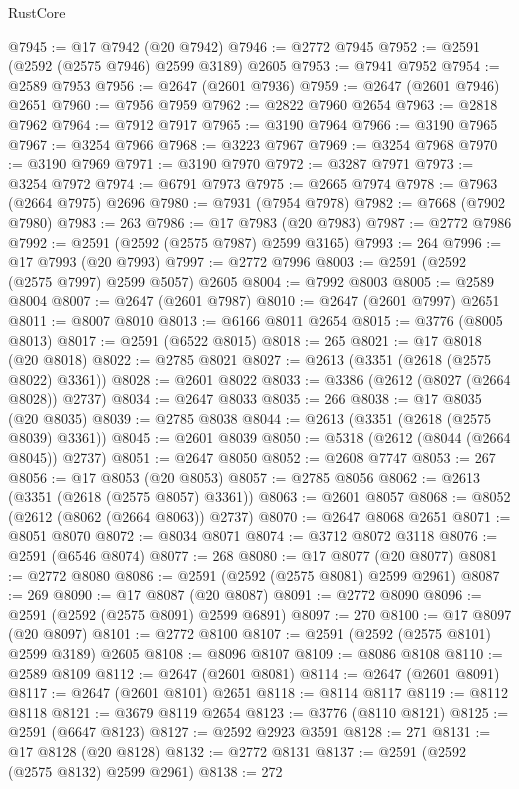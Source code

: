 \begin{lexlean}{RustCore}
\begin{coremodule}
@7945 := @17 @7942 (@20 @7942)
@7946 := @2772 @7945
@7952 := @2591 (@2592 (@2575 @7946) @2599 @3189) @2605
@7953 := @7941 @7952
@7954 := @2589 @7953
@7956 := @2647 (@2601 @7936)
@7959 := @2647 (@2601 @7946) @2651
@7960 := @7956 @7959
@7962 := @2822 @7960 @2654
@7963 := @2818 @7962
@7964 := @7912 @7917
@7965 := @3190 @7964
@7966 := @3190 @7965
@7967 := @3254 @7966
@7968 := @3223 @7967
@7969 := @3254 @7968
@7970 := @3190 @7969
@7971 := @3190 @7970
@7972 := @3287 @7971
@7973 := @3254 @7972
@7974 := @6791 @7973
@7975 := @2665 @7974
@7978 := @7963 (@2664 @7975) @2696
@7980 := @7931 (@7954 @7978)
@7982 := @7668 (@7902 @7980)
@7983 := 263
@7986 := @17 @7983 (@20 @7983)
@7987 := @2772 @7986
@7992 := @2591 (@2592 (@2575 @7987) @2599 @3165)
@7993 := 264
@7996 := @17 @7993 (@20 @7993)
@7997 := @2772 @7996
@8003 := @2591 (@2592 (@2575 @7997) @2599 @5057) @2605
@8004 := @7992 @8003
@8005 := @2589 @8004
@8007 := @2647 (@2601 @7987)
@8010 := @2647 (@2601 @7997) @2651
@8011 := @8007 @8010
@8013 := @6166 @8011 @2654
@8015 := @3776 (@8005 @8013)
@8017 := @2591 (@6522 @8015)
@8018 := 265
@8021 := @17 @8018 (@20 @8018)
@8022 := @2785 @8021
@8027 := @2613 (@3351 (@2618 (@2575 @8022) @3361))
@8028 := @2601 @8022
@8033 := @3386 (@2612 (@8027 (@2664 @8028)) @2737)
@8034 := @2647 @8033
@8035 := 266
@8038 := @17 @8035 (@20 @8035)
@8039 := @2785 @8038
@8044 := @2613 (@3351 (@2618 (@2575 @8039) @3361))
@8045 := @2601 @8039
@8050 := @5318 (@2612 (@8044 (@2664 @8045)) @2737)
@8051 := @2647 @8050
@8052 := @2608 @7747
@8053 := 267
@8056 := @17 @8053 (@20 @8053)
@8057 := @2785 @8056
@8062 := @2613 (@3351 (@2618 (@2575 @8057) @3361))
@8063 := @2601 @8057
@8068 := @8052 (@2612 (@8062 (@2664 @8063)) @2737)
@8070 := @2647 @8068 @2651
@8071 := @8051 @8070
@8072 := @8034 @8071
@8074 := @3712 @8072 @3118
@8076 := @2591 (@6546 @8074)
@8077 := 268
@8080 := @17 @8077 (@20 @8077)
@8081 := @2772 @8080
@8086 := @2591 (@2592 (@2575 @8081) @2599 @2961)
@8087 := 269
@8090 := @17 @8087 (@20 @8087)
@8091 := @2772 @8090
@8096 := @2591 (@2592 (@2575 @8091) @2599 @6891)
@8097 := 270
@8100 := @17 @8097 (@20 @8097)
@8101 := @2772 @8100
@8107 := @2591 (@2592 (@2575 @8101) @2599 @3189) @2605
@8108 := @8096 @8107
@8109 := @8086 @8108
@8110 := @2589 @8109
@8112 := @2647 (@2601 @8081)
@8114 := @2647 (@2601 @8091)
@8117 := @2647 (@2601 @8101) @2651
@8118 := @8114 @8117
@8119 := @8112 @8118
@8121 := @3679 @8119 @2654
@8123 := @3776 (@8110 @8121)
@8125 := @2591 (@6647 @8123)
@8127 := @2592 @2923 @3591
@8128 := 271
@8131 := @17 @8128 (@20 @8128)
@8132 := @2772 @8131
@8137 := @2591 (@2592 (@2575 @8132) @2599 @2961)
@8138 := 272

\end{coremodule}
\end{lexlean}
